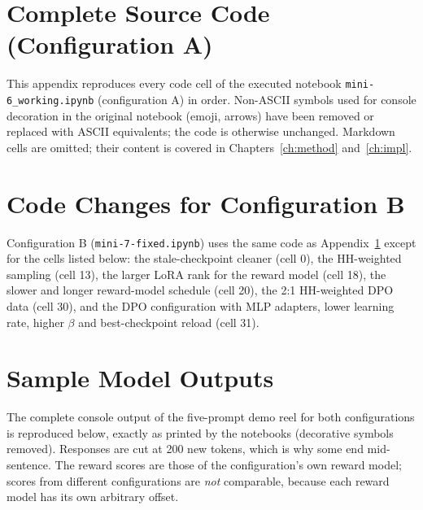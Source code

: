 \chapter{Complete Source Code (Configuration A)}
\label{app:code}

This appendix reproduces every code cell of the executed notebook \texttt{mini-6\_}\allowbreak\texttt{working.ipynb} (configuration A) in order. Non-ASCII symbols used for console decoration in the original notebook (emoji, arrows) have been removed or replaced with ASCII equivalents; the code is otherwise unchanged. Markdown cells are omitted; their content is covered in Chapters~\ref{ch:method} and~\ref{ch:impl}.



\chapter{Code Changes for Configuration B}
\label{app:codeB}

Configuration B (\texttt{mini-7-fixed.ipynb}) uses the same code as Appendix~\ref{app:code} except for the cells listed below: the stale-checkpoint cleaner (cell 0), the HH-weighted sampling (cell 13), the larger LoRA rank for the reward model (cell 18), the slower and longer reward-model schedule (cell 20), the 2:1 HH-weighted DPO data (cell 30), and the DPO configuration with MLP adapters, lower learning rate, higher $\beta$ and best-checkpoint reload (cell 31).



\chapter{Sample Model Outputs}
\label{app:outputs}

The complete console output of the five-prompt demo reel for both configurations is reproduced below, exactly as printed by the notebooks (decorative symbols removed). Responses are cut at 200 new tokens, which is why some end mid-sentence. The reward scores are those of the configuration's own reward model; scores from different configurations are \emph{not} comparable, because each reward model has its own arbitrary offset.

